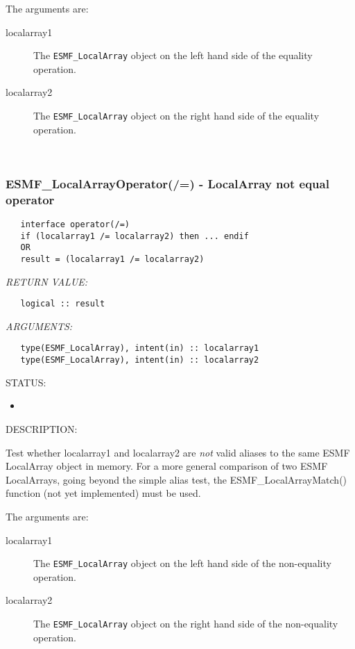    The arguments are:
   \begin{description}
   \item[localarray1]
   The {\tt ESMF\_LocalArray} object on the left hand side of the equality
   operation.
   \item[localarray2]
   The {\tt ESMF\_LocalArray} object on the right hand side of the equality
   operation.
   \end{description}
   
 
\mbox{}\hrulefill\ 
 
\subsubsection [ESMF\_LocalArrayOperator(/=)] {ESMF\_LocalArrayOperator(/=) - LocalArray not equal operator}


  
\begin{verbatim}   interface operator(/=)
   if (localarray1 /= localarray2) then ... endif
   OR
   result = (localarray1 /= localarray2)\end{verbatim}{\em RETURN VALUE:}
\begin{verbatim}   logical :: result\end{verbatim}{\em ARGUMENTS:}
\begin{verbatim}   type(ESMF_LocalArray), intent(in) :: localarray1
   type(ESMF_LocalArray), intent(in) :: localarray2\end{verbatim}
{\sf STATUS:}
   \begin{itemize}
   \item{}
   \end{itemize}
  
{\sf DESCRIPTION:\\ }


   Test whether localarray1 and localarray2 are {\it not} valid aliases to the
   same ESMF LocalArray object in memory. For a more general comparison of two ESMF
   LocalArrays, going beyond the simple alias test, the ESMF\_LocalArrayMatch() function
   (not yet implemented) must be used.
  
   The arguments are:
   \begin{description}
   \item[localarray1]
   The {\tt ESMF\_LocalArray} object on the left hand side of the non-equality
   operation.
   \item[localarray2]
   The {\tt ESMF\_LocalArray} object on the right hand side of the non-equality
   operation.
   \end{description}
   
